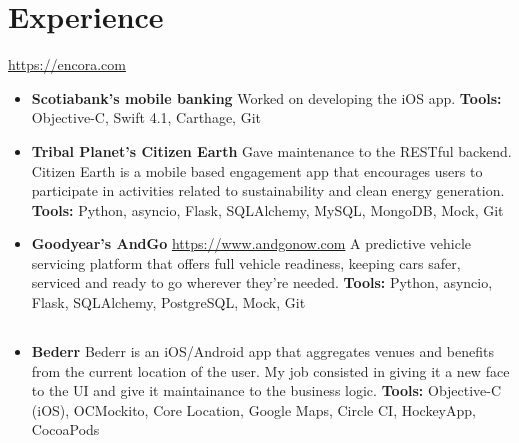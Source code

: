 \documentclass[11pt,a4paper,english]{moderncv}
\begin{document}
\maketitle

\section{Experience}

{
\url{https://encora.com}
\newline{}
\begin{itemize}
    \item \textbf{Scotiabank's mobile banking}
        \newline{}
	    Worked on developing the iOS app.
        \newline{}
        \textbf{Tools:} Objective-C, Swift 4.1, Carthage, Git
    \item \textbf{Tribal Planet's Citizen Earth}
        \newline{}
        Gave maintenance to the RESTful backend. Citizen Earth is a mobile based engagement app that encourages users to participate in activities related to sustainability and clean energy generation.
        \newline{}
        \textbf{Tools:} Python, asyncio, Flask, SQLAlchemy, MySQL, MongoDB, Mock, Git
    \item \textbf{Goodyear's AndGo}
        \newline{}
        \url{https://www.andgonow.com}
        \newline{}
        A predictive vehicle servicing platform that offers full vehicle readiness, keeping cars safer, serviced and ready to go wherever they’re needed.
        \textbf{Tools:} Python, asyncio, Flask, SQLAlchemy, PostgreSQL, Mock, Git
\end{itemize}
}

\subsection{}

{
\begin{itemize}
    \item \textbf{Bederr}
        \newline{}
        Bederr is an iOS/Android app that aggregates venues and benefits from the current location of the user. My job consisted in giving it a new face to the UI and give it maintainance to the business logic.
        \newline{}
        \textbf{Tools:} Objective-C (iOS), OCMockito, Core Location, Google Maps, Circle CI, HockeyApp, CocoaPods
\end{itemize}
}
\end{document}
